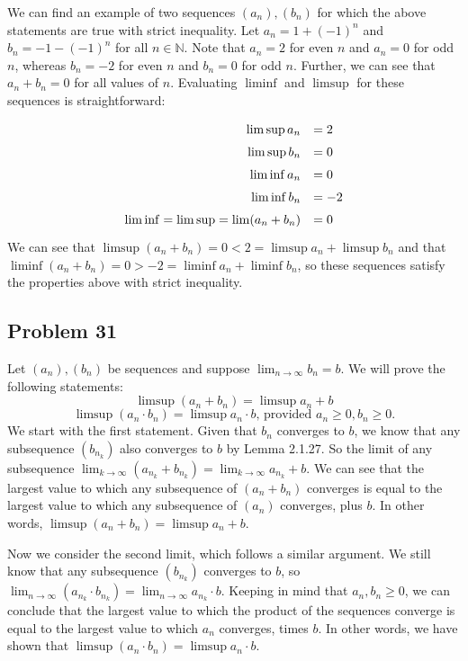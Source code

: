 \documentclass[11pt]{article}
\newcommand{\N}{\mathbb{N}}
\begin{document}
We can find an example of two sequences $(a_n), (b_n)$ for which the above statements
are true with strict inequality. Let $a_n = 1+(-1)^n$ and $b_n = -1-(-1)^n$
for all $n\in\N$. Note that $a_n=2$ for even $n$ and $a_n=0$ for odd $n$, whereas
$b_n = -2$ for even $n$ and $b_n=0$ for odd $n$. Further, we can see that
$a_n+b_n=0$ for all values of $n$. Evaluating $\liminf$ and $\limsup$ for these
sequences is straightforward:
\[
\def\arraystretch{1.5}
\begin{array}{rl}
\limsup a_n &= 2 \\
\limsup b_n &= 0 \\
\liminf a_n &= 0 \\
\liminf b_n &= -2 \\
\liminf = \limsup = \lim (a_n+b_n) &= 0
\end{array}
\]
We can see that $\limsup(a_n+b_n) = 0 < 2 = \limsup a_n + \limsup b_n$ and that
$\liminf(a_n+b_n) = 0 > -2 = \liminf a_n + \liminf b_n$, so these sequences
satisfy the properties above with strict inequality.

\subsection*{Problem 31}

Let $(a_n),(b_n)$ be sequences and suppose $\lim_{n\to\infty}b_n=b$.
We will prove the following statements:
\[\limsup (a_n+b_n) = \limsup a_n + b\]
\[\limsup (a_n\cdot b_n) = \limsup a_n\cdot b \textrm{, provided }a_n\geq0, b_n\geq0.\]
We start with the first statement. Given that $b_n$ converges to $b$, we know that
any subsequence $(b_{n_k})$ also converges to $b$ by Lemma 2.1.27. So the limit of
any subsequence $\lim_{k\to\infty}(a_{n_k}+b_{n_k})=\lim_{k\to\infty}a_{n_k}+b$.
We can see that the largest value to which any subsequence of $(a_n+b_n)$ converges 
is equal to the largest value to which any subsequence of $(a_n)$ converges, plus $b$.
In other words, $\limsup (a_n+b_n) = \limsup a_n + b$.

Now we consider the second limit, which follows a similar argument. We still know
that any subsequence $(b_{n_k})$ converges to $b$, so
$\lim_{n\to\infty}(a_{n_k}\cdot b_{n_k})=\lim_{n\to\infty}a_{n_k}\cdot b$.
Keeping in mind that $a_n, b_n \geq 0$, we can conclude that the largest
value to which the product of the sequences converge is equal to the largest value
to which $a_n$ converges, times $b$. In other words, we have shown that 
$\limsup (a_n\cdot b_n) = \limsup a_n\cdot b$.
\end{document}
